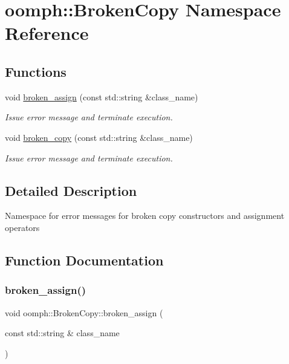 \hypertarget{namespaceoomph_1_1BrokenCopy}{}\section{oomph\+:\+:Broken\+Copy Namespace Reference}
\label{namespaceoomph_1_1BrokenCopy}
\subsection*{Functions}
\begin{DoxyCompactItemize}
\item 
void \hyperlink{namespaceoomph_1_1BrokenCopy_a32dc384e671e786bac0c67cbff701f45}{broken\+\_\+assign} (const std\+::string \&class\+\_\+name)
\begin{DoxyCompactList}\small\item\em Issue error message and terminate execution. \end{DoxyCompactList}\item 
void \hyperlink{namespaceoomph_1_1BrokenCopy_a7e5cd7fda8b8c790003151bee77a84ac}{broken\+\_\+copy} (const std\+::string \&class\+\_\+name)
\begin{DoxyCompactList}\small\item\em Issue error message and terminate execution. \end{DoxyCompactList}\end{DoxyCompactItemize}


\subsection{Detailed Description}
Namespace for error messages for broken copy constructors and assignment operators 

\subsection{Function Documentation}
\mbox{\label{namespaceoomph_1_1BrokenCopy_a32dc384e671e786bac0c67cbff701f45}} 
\subsubsection{\texorpdfstring{broken\+\_\+assign()}{broken\_assign()}}
{\footnotesize\ttfamily void oomph\+::\+Broken\+Copy\+::broken\+\_\+assign (\begin{DoxyParamCaption}\item[{const std\+::string \&}]{class\+\_\+name }\end{DoxyParamCaption})}



